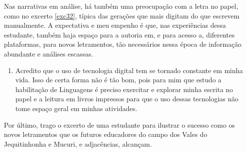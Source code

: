 \documentclass{textolivre}
\begin{document}
Nas narrativas em análise, há também uma preocupação com a letra no papel, como no excerto \ref{exc32}, típica das gerações que mais digitam do que escrevem manualmente. A expectativa e meu empenho é que, nas experiências dessa estudante, também haja espaço para a autoria em, e para acesso a, diferentes plataformas, para novos letramentos, tão necessários nessa época de informação abundante e análises escassas.


\begin{enumerate}[resume,label={(\arabic*)},ref={\arabic*},topsep=1ex,partopsep=1ex]
\item\label{exc32} Acredito que o uso de tecnologia digital tem se tornado constante em minha vida. Isso de certa forma não é tão bom, pois para mim que estudo a habilitação de Linguagens é preciso exercitar e explorar minha escrita no papel e a leitura em livros impressos para que o uso dessas tecnologias não tome espaço geral em minhas atividades.
\end{enumerate}

Por último, trago o excerto de uma estudante para ilustrar o sucesso como os novos letramentos que os futuros educadores do campo dos Vales do Jequitinhonha e Mucuri, e adjacências, alcançam.

\end{document}

